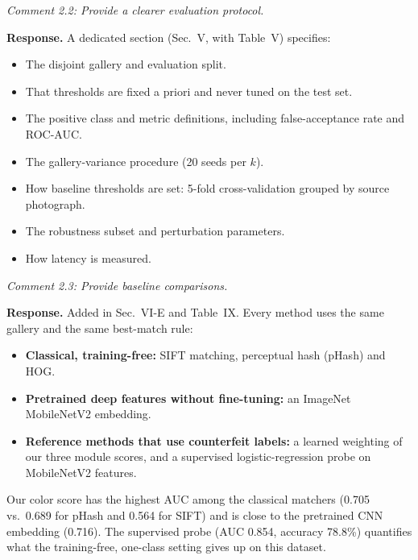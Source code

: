 \documentclass[10pt,a4paper]{article}
\newenvironment{comment}{\par\medskip\noindent\begin{minipage}{\linewidth}\color{black!70}\itshape}{\end{minipage}\par\smallskip}
\begin{document}
\begin{comment}Comment 2.2: Provide a clearer evaluation protocol.\end{comment}
\textbf{Response.} A dedicated section (Sec.~V, with Table~V) specifies:
\begin{itemize}[nosep,leftmargin=1.2em]
\item The disjoint gallery and evaluation split.
\item That thresholds are fixed a priori and never tuned on the test set.
\item The positive class and metric definitions, including false-acceptance rate and ROC-AUC.
\item The gallery-variance procedure (20 seeds per $k$).
\item How baseline thresholds are set: 5-fold cross-validation grouped by source photograph.
\item The robustness subset and perturbation parameters.
\item How latency is measured.
\end{itemize}

\begin{comment}Comment 2.3: Provide baseline comparisons.\end{comment}
\textbf{Response.} Added in Sec.~VI-E and Table~IX. Every method uses the same gallery and the same best-match rule:
\begin{itemize}[nosep,leftmargin=1.2em]
\item \textbf{Classical, training-free:} SIFT matching, perceptual hash (pHash) and HOG.
\item \textbf{Pretrained deep features without fine-tuning:} an ImageNet MobileNetV2 embedding.
\item \textbf{Reference methods that use counterfeit labels:} a learned weighting of our three module scores, and a supervised logistic-regression probe on MobileNetV2 features.
\end{itemize}
Our color score has the highest AUC among the classical matchers (0.705 vs.\ 0.689 for pHash and 0.564 for SIFT) and is close to the pretrained CNN embedding (0.716). The supervised probe (AUC 0.854, accuracy 78.8\%) quantifies what the training-free, one-class setting gives up on this dataset.
\end{document}
